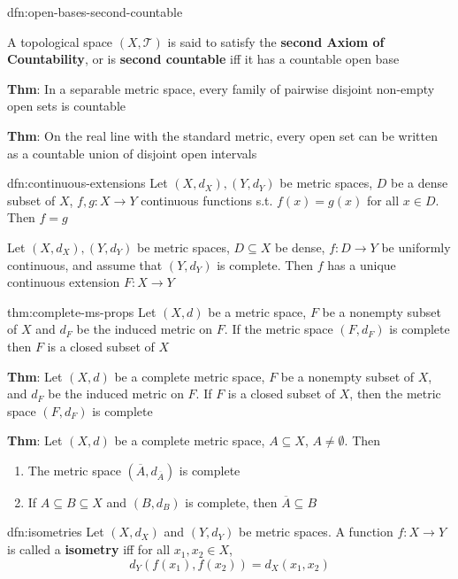 \documentclass[landscape, 8pt]{extarticle}
\begin{document}
\begin{multicols}{3}
\begin{dfn}{dfn:open-bases-second-countable}{}

    A topological space $(X, \mathcal{T})$ is said to satisfy the \textbf{second Axiom of Countability}, or is \textbf{second countable} iff it has a countable open base

    \longrule{0.08ex}
    \textbf{Thm}: In a separable metric space, every family of pairwise disjoint non-empty open sets is countable

    \longrule{0.08ex}
    \textbf{Thm}: On the real line with the standard metric, every open set can be written as a countable union of disjoint open intervals
\end{dfn}

\begin{dfn}{dfn:continuous-extensions}{}
    Let $(X, d_{X}), (Y, d_{Y})$ be metric spaces, $D$ be a dense subset of $X$, $f, g : X \to Y$ continuous functions s.t. $f(x) = g(x)$ for all $x\in D$. Then $f = g$

    \longrule{0.08ex}
    Let $(X, d_{X}), (Y, d_{Y})$ be metric spaces, $D \subseteq X$ be dense, $f : D \to Y$ be uniformly continuous, and assume that $(Y, d_{Y})$ is complete. Then $f$ has a unique continuous extension $F : X \to Y$
\end{dfn}

\begin{thm}{thm:complete-ms-props}{}
    Let $(X, d)$ be a metric space, $F$ be a nonempty subset of $X$ and $d_{F}$ be the induced metric on $F$. If the metric space $(F, d_{F})$ is complete then $F$ is a closed subset of $X$

    \longrule{0.08ex}
    \textbf{Thm}: Let $(X, d)$ be a complete metric space, $F$ be a nonempty subset of $X$, and $d_{F}$ be the induced metric on $F$. If $F$ is a closed subset of $X$, then the metric space $(F, d_{F})$ is complete

    \longrule{0.08ex}
    \textbf{Thm}: Let $(X, d)$ be a complete metric space, $A \subseteq X$, $A \ne \emptyset$. Then
    \begin{enumerate}
        \item The metric space $(\overline{A}, d_{\overline{A}})$ is complete
        \item If $A \subseteq B \subseteq X$ and $(B, d_{B})$ is complete, then $\overline{A} \subseteq B$
    \end{enumerate}
\end{thm}

\begin{dfn}[Isometries]{dfn:isometries}{}
    Let $(X, d_{X})$ and $(Y, d_{Y})$ be metric spaces. A function $f : X \to Y$ is called a \textbf{isometry} iff for all $x_{1}, x_{2}\in X$,
    \[d_{Y}(f(x_{1}), f(x_{2})) = d_{X}(x_{1}, x_{2})\]


\end{dfn}
\end{multicols}
\end{document}
